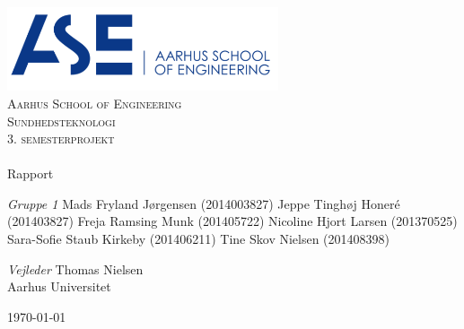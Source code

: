 \begin{titlingpage}
\begin{center}

~ \\[3cm]

\includegraphics[width=0.6\textwidth]{figurer/ASE}~\\[1cm]

\textsc{\LARGE Aarhus School of Engineering}\\[1.5cm]

\textsc{\Large Sundhedsteknologi}\\
\textsc{\Large 3. semesterprojekt}\\[0.5cm]

\noindent\makebox[\linewidth]{\rule{\textwidth}{0.4pt}}\\
[0.5cm]{\Huge Rapport}
\noindent\makebox[\linewidth]{\rule{\textwidth}{0.4pt}}

\end{center}

\textit{Gruppe 1} \newline
Mads Fryland J\o rgensen (2014003827) \newline
Jeppe Tingh\o j Honeré (201403827) \newline
Freja Ramsing Munk (201405722) \newline		 
Nicoline Hjort Larsen (201370525) \newline 
Sara-Sofie Staub Kirkeby (201406211) \newline
Tine Skov Nielsen (201408398) \newline


\textit{Vejleder} \newline
Thomas Nielsen\\
Aarhus Universitet


\vfill

\begin{center}
{\large \today}
\end{center}


\end{titlingpage}